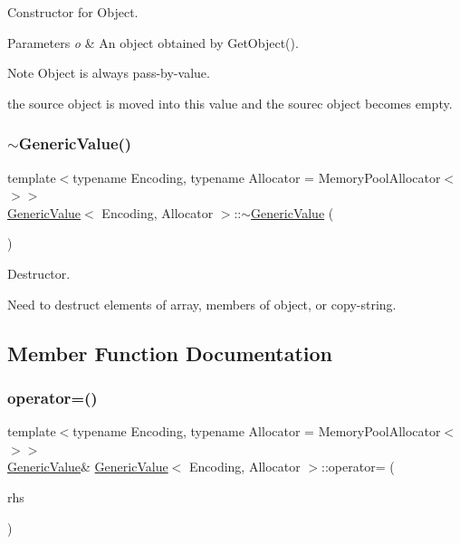 Constructor for Object. 


\begin{DoxyParams}{Parameters}
{\em o} & An object obtained by {\ttfamily Get\+Object()}. \\
\hline
\end{DoxyParams}
\begin{DoxyNote}{Note}
{\ttfamily Object} is always pass-\/by-\/value. 

the source object is moved into this value and the sourec object becomes empty. 
\end{DoxyNote}
\mbox{\label{a01992_a213ba89ef5ef961a5e655bd8c78ac9f4}} 
\subsubsection{\texorpdfstring{$\sim$\+Generic\+Value()}{~GenericValue()}}
{\footnotesize\ttfamily template$<$typename Encoding, typename Allocator = Memory\+Pool\+Allocator$<$$>$$>$ \\
\hyperlink{a01992}{Generic\+Value}$<$ Encoding, Allocator $>$\+::$\sim$\hyperlink{a01992}{Generic\+Value} (\begin{DoxyParamCaption}{ }\end{DoxyParamCaption})\hspace{0.3cm}{\ttfamily [inline]}}



Destructor. 

Need to destruct elements of array, members of object, or copy-\/string. 

\subsection{Member Function Documentation}
\mbox{\label{a01992_a9018a40d7c52efc00daf803c51d3236c}} 
\subsubsection{\texorpdfstring{operator=()}{operator=()}\hspace{0.1cm}{\footnotesize\ttfamily [1/2]}}
{\footnotesize\ttfamily template$<$typename Encoding, typename Allocator = Memory\+Pool\+Allocator$<$$>$$>$ \\
\hyperlink{a01992}{Generic\+Value}\& \hyperlink{a01992}{Generic\+Value}$<$ Encoding, Allocator $>$\+::operator= (\begin{DoxyParamCaption}\item[{\hyperlink{a01992}{Generic\+Value}$<$ Encoding, Allocator $>$ \&}]{rhs }\end{DoxyParamCaption})\hspace{0.3cm}{\ttfamily [inline]}}



